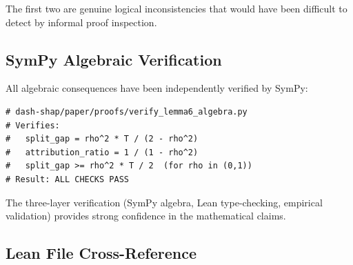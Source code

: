 \documentclass{article}
\begin{document}
The first two are genuine logical inconsistencies that would have been difficult to detect by informal proof inspection.

\subsection{SymPy Algebraic Verification}

All algebraic consequences have been independently verified by SymPy:

\begin{verbatim}
# dash-shap/paper/proofs/verify_lemma6_algebra.py
# Verifies:
#   split_gap = rho^2 * T / (2 - rho^2)
#   attribution_ratio = 1 / (1 - rho^2)
#   split_gap >= rho^2 * T / 2  (for rho in (0,1))
# Result: ALL CHECKS PASS
\end{verbatim}

The three-layer verification (SymPy algebra, Lean type-checking, empirical validation) provides strong confidence in the mathematical claims.

\subsection{Lean File Cross-Reference}
\end{document}
